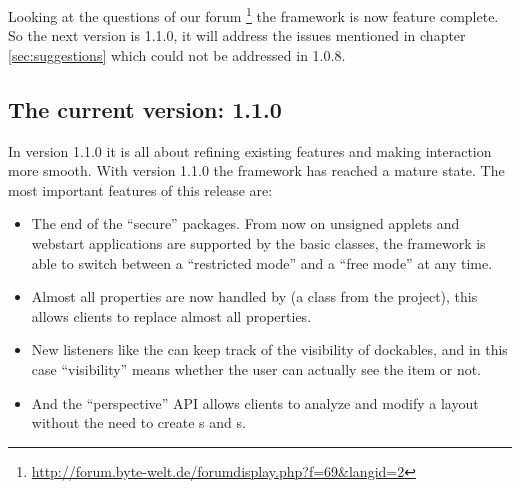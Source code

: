 Looking at the questions of our forum \footnote{\url{http://forum.byte-welt.de/forumdisplay.php?f=69&langid=2}} the framework is now feature complete. So the next version is 1.1.0, it will address the issues mentioned in chapter \ref{sec:suggestions} which could not be addressed in 1.0.8.

\subsection{The current version: 1.1.0}
In version 1.1.0 it is all about refining existing features and making interaction more smooth. With version 1.1.0 the framework has reached a mature state. The most important features of this release are:
\begin{itemize}
 \item The end of the ``secure'' packages. From now on unsigned applets and webstart applications are supported by the basic classes, the framework is able to switch between a ``restricted mode'' and a ``free mode'' at any time.
 \item Almost all properties are now handled by  (a class from the  project), this allows clients to replace almost all properties.
 \item New listeners like the  can keep track of the visibility of dockables, and in this case ``visibility'' means whether the user can actually see the item or not.
 \item And the ``perspective'' API allows clients to analyze and modify a layout without the need to create s and s.
\end{itemize}
